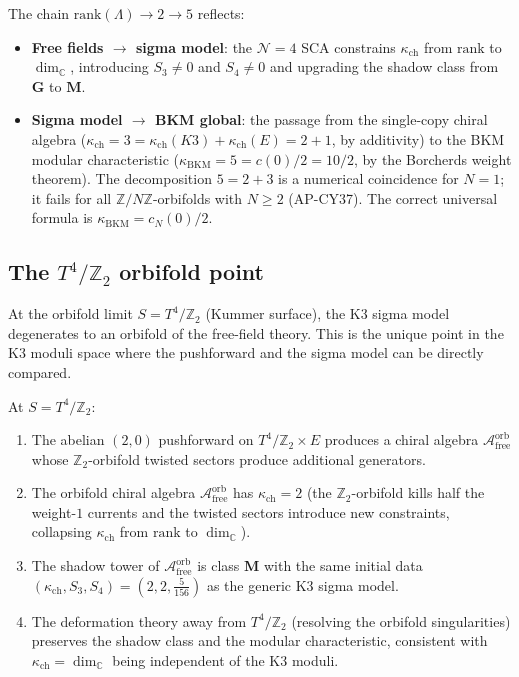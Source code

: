 \documentclass[11pt]{article}
\newcommand{\cA}{\mathcal{A}}
\newcommand{\cN}{\mathcal{N}}
\newcommand{\C}{\mathbb{C}}
\newcommand{\Z}{\mathbb{Z}}
\begin{document}
\noindent The chain $\mathrm{rank}(\Lambda) \to 2 \to 5$ reflects:
\begin{itemize}
 \item \textbf{Free fields $\to$ sigma model}: the $\cN = 4$ SCA constrains $\kappa_{\mathrm{ch}}$ from $\mathrm{rank}$ to $\dim_\C$, introducing $S_3 \neq 0$ and $S_4 \neq 0$ and upgrading the shadow class from $\mathbf{G}$ to $\mathbf{M}$.
 \item \textbf{Sigma model $\to$ BKM global}: the passage from the single-copy chiral algebra ($\kappa_{\mathrm{ch}} = 3 = \kappa_{\mathrm{ch}}(K3) + \kappa_{\mathrm{ch}}(E) = 2 + 1$, by additivity) to the BKM modular characteristic ($\kappa_{\mathrm{BKM}} = 5 = c(0)/2 = 10/2$, by the Borcherds weight theorem). The decomposition $5 = 2 + 3$ is a numerical coincidence for $N = 1$; it fails for all $\Z/N\Z$-orbifolds with $N \geq 2$ (AP-CY37). The correct universal formula is $\kappa_{\mathrm{BKM}} = c_N(0)/2$.
\end{itemize}

\subsection{The $T^4/\Z_2$ orbifold point}
\label{subsec:t4z2}

At the orbifold limit $S = T^4/\Z_2$ (Kummer surface), the K3 sigma model degenerates to an orbifold of the free-field theory. This is the unique point in the K3 moduli space where the pushforward and the sigma model can be directly compared.

\begin{conjecture}
\label{conj:orbifold-agreement}
At $S = T^4/\Z_2$:
\begin{enumerate}[label=\textup{(\alph*)}]
 \item The abelian $(2,0)$ pushforward on $T^4/\Z_2 \times E$ produces a chiral algebra $\cA_{\mathrm{free}}^{\mathrm{orb}}$ whose $\Z_2$-orbifold twisted sectors produce additional generators.
 \item The orbifold chiral algebra $\cA_{\mathrm{free}}^{\mathrm{orb}}$ has $\kappa_{\mathrm{ch}} = 2$ (the $\Z_2$-orbifold kills half the weight-$1$ currents and the twisted sectors introduce new constraints, collapsing $\kappa_{\mathrm{ch}}$ from $\mathrm{rank}$ to $\dim_\C$).
 \item The shadow tower of $\cA_{\mathrm{free}}^{\mathrm{orb}}$ is class $\mathbf{M}$ with the same initial data $(\kappa_{\mathrm{ch}}, S_3, S_4) = (2, 2, \frac{5}{156})$ as the generic K3 sigma model.
 \item The deformation theory away from $T^4/\Z_2$ (resolving the orbifold singularities) preserves the shadow class and the modular characteristic, consistent with $\kappa_{\mathrm{ch}} = \dim_\C$ being independent of the K3 moduli.
\end{enumerate}
\end{conjecture}
\end{document}
